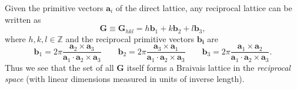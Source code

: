 Given the primitive vectors $\mathbf{a}_i$ of the direct lattice, any reciprocal lattice can be written as
\begin{equation}
\mathbf{G} \equiv \mathbf{G}_{hkl}  = h \mathbf{b}_1 + k \mathbf{b}_2 + l \mathbf{b}_3,
\end{equation}
where $h,k,l \in \mathds{Z}$ and the reciprocal primitive vectors $\mathbf{b_i}$ are
\begin{equation}
\mathbf{b}_1 = 2 \pi \frac{\mathbf{a}_2 \times \mathbf{a}_3}{\mathbf{a}_1 \cdot \mathbf{a}_2 \times \mathbf{a}_3} \qquad
\mathbf{b}_2 = 2 \pi \frac{\mathbf{a}_3 \times \mathbf{a}_1}{\mathbf{a}_1 \cdot \mathbf{a}_2 \times \mathbf{a}_3} \qquad
\mathbf{b}_3 = 2 \pi \frac{\mathbf{a}_1 \times \mathbf{a}_2}{\mathbf{a}_1 \cdot \mathbf{a}_2 \times \mathbf{a}_3}.
\end{equation}
Thus we see that the set of all $\mathbf{G}$ itself forms a Braivais lattice in the \emph{reciprocal space} (with linear dimensions measured in units of inverse length).

